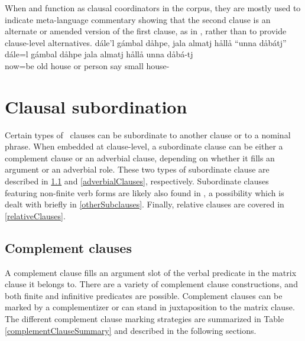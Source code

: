 When  and  function as clausal coordinators in the corpus, 
they are mostly used to indicate meta-language commentary showing that the second clause is an alternate or amended version of the first clause, as in , rather than to provide clause-level alternatives.
\ea\label{ORcoordination1}%
\glll	dále’l gámbal dåhpe, jala almatj hållå “unna dåbátj”\\
	dále=l gámbal dåhpe jala almatj hållå unna dåbá-tj\\
	now=be\BS{} old house\BS{} or person\BS{} say\BS{} small house-\BS{}\\\nopagebreak
{} %
\z
{}

\section{Clausal subordination}\label{clausalSubordination}
Certain types of \PS\ clauses can be subordinate to another clause or to a nominal phrase. %
When embedded at clause-level, a subordinate clause can be either a complement clause or an adverbial clause, depending on whether it fills an argument or an adverbial role. 
These two types of subordinate clause are described in \SEC\ref{complementClauses} and \SEC\ref{adverbialClauses}, respectively. 
Subordinate clauses featuring non-finite verb forms are likely also found in \PS, a possibility which is dealt with briefly in \SEC\ref{otherSubclauses}. 
Finally, relative clauses are covered in \SEC\ref{relativeClauses}.

\subsection{Complement clauses}\label{complementClauses}
A complement clause fills an argument slot of the verbal predicate in the matrix clause it belongs to. 
There are a variety of complement clause constructions, and both finite and infinitive predicates are possible. Complement clauses can be marked by a complementizer %
or can stand in juxtaposition to the matrix clause. %
The different complement clause marking strategies are summarized in Table \vref{complementClauseSummary} and described in the following sections.

